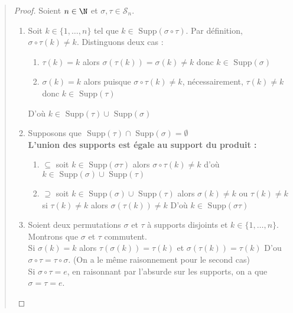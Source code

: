 \begin{quote}
	\footnotesize
	\begin{proof}
		Soient $n \in \N$ et $\sigma, \tau \in \mathcal{S}_n$.
		\begin{enumerate}
			\item Soit $k \in \{1,\dots,n\}$ tel que $ k \in \text{ Supp}(\sigma\circ\tau)$.
			Par définition, $\sigma \circ \tau (k) \not = k$. Distinguons deux cas :
				\begin{enumerate}
					\item $\tau(k) = k$ alors $\sigma (\tau(k)) = \sigma (k) \not = k$ donc $k \in \text{ Supp}(\sigma)$
					\item $\sigma(k) = k$ alors puisque $\sigma \circ \tau (k) \not = k$, nécessairement, $\tau (k) \not = k$ donc $k \in \text{ Supp}(\tau)$
				\end{enumerate}
				D'où $ k \in \text{ Supp}(\tau) \cup \text{ Supp}(\sigma)$
			\item Supposons que $\text{ Supp}(\tau) \cap \text{ Supp}(\sigma) = \emptyset$ \\ 
			\textbf{L'union des supports est égale au support du produit :}
			\begin{enumerate}
					\item $\boxed{\subseteq}$ soit $k \in \text{ Supp}(\sigma \tau)$ alors $\sigma \circ \tau (k) \not = k$
							d'où $k \in \text{ Supp}(\sigma) \cup \text{ Supp}(\tau)$
					\item $\boxed{\supseteq}$ soit $k \in \text{ Supp}(\sigma) \cup \text{ Supp}(\tau)$ alors $\sigma (k) \not = k$ ou $ \tau(k) \not = k$ 
							si $ \tau(k) \not = k $ alors $ \sigma(\tau(k)) \not = k$
							D'où $ k \in \text{ Supp}(\sigma \tau)$
			\end{enumerate}
			\item Soient deux permutations $\sigma$ et $\tau$ à supports disjoints et $k \in \{1,\dots,n\}$.
			Montrons que $\sigma$ et $\tau$ commutent. \\
			Si $\sigma(k)=k$ alors $\tau(\sigma(k))= \tau(k)$ et $\sigma(\tau(k)) = \tau(k)$
			D'ou $ \sigma \circ \tau = \tau \circ \sigma$. (On a le même raisonnement pour le second cas) \\
			Si $\sigma \circ \tau = e$, en raisonnant par l'absurde sur les supports, on a que $\sigma = \tau = e$.
		\end{enumerate}
	\end{proof}
	\normalsize
\end{quote}


